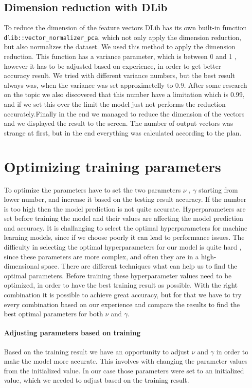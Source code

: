 \documentclass[english,12pt,oneside,a4paper]{article}
\begin{document}
		\subsection{Dimension reduction with DLib}
		To reduce the dimension of the feature vectors DLib has its own built-in function \verb|dlib::vector_normalizer_pca|, which not only apply the dimension reduction, but also normalizes the dataset. We used this method to apply the dimension reduction. This function has a variance parameter, which is between 0 and 1 , however it has to be adjusted based on experience, in order to get better accuracy result. We tried with different variance numbers, but the best result always was, when the variance was set approximetelly to 0.9. After some research on the topic we also discovered that this number have a limitation which is 0.99, and if we set this over the limit the model just not performs the reduction accurately.Finally in the end we managed to reduce the dimension of the vectors and we displayed the result to the screen. The number of output vectors was strange at first, but in the end everything was calculated according to the plan.
		\section{Optimizing training parameters}
		To optimize the parameters have to set the two parameters  $\nu$ , $\gamma$ starting from lower number, and increase it based on the testing result accuracy. If the number is too high then the model prediction is not quite accurate.
		Hyperparameters are set before training the model and their values are affecting the model prediction and accuracy. It is challanging to select the optimal hyperparameters for machine learning models, since if we choose poorly it can lead to performance issues. The difficulty in selecting the optimal hyperparameters for our model is quite hard , since these parameters are more complex, and often they are in a high-dimensional space. There are different techniques what can help us to find the optimal parameters. Before training these hyperparameter values need to be optimized, in order to have the best training result as possible. With the right combination it is possible to achieve great accuracy, but for that we have to try every combination based on our experience and compare the results to find the best optimal parameters for both  $\nu$ and  $\gamma$.
		\paragraph{Adjusting parameters based on training}
		Based on the training result we have an opportunity to adjust $\nu$ and $\gamma$ in order to make the model more accurate. This involves with changing the parameter values from the initialized value. In our case those parameters were set to an initialized value, which we needed to adjust based on the training result. 
\end{document}
